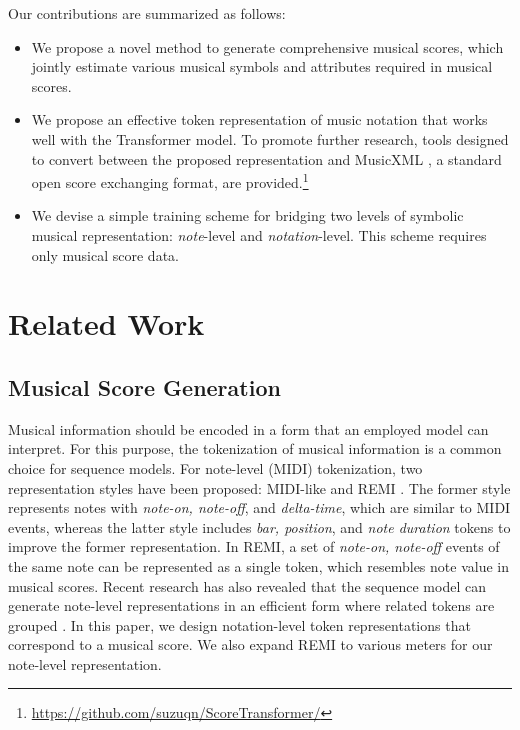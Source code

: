 \documentclass[sigconf]{acmart} %
\begin{document}
Our contributions are summarized as follows:
\begin{itemize}[leftmargin=1.25em]
\item We propose a novel method to generate comprehensive musical scores, which jointly estimate various musical symbols and attributes required in musical scores.
\item We propose an effective token representation of music notation that works well with the Transformer model. To promote further research, tools designed to convert between the proposed representation and MusicXML \cite{Good2003}, a standard open score exchanging format, are provided.\footnote{\url{https://github.com/suzuqn/ScoreTransformer/}}
\item We devise a simple training scheme for bridging two levels of symbolic musical representation: \textit{note}-level and \textit{notation}-level. This scheme requires only musical score data.
\end{itemize}

\section{Related Work}
\subsection{Musical Score Generation}
Musical information should be encoded in a form that an employed model can interpret. For this purpose, the tokenization of musical information is a common choice for sequence models. For note-level (MIDI) tokenization, two representation styles have been proposed: MIDI-like \cite{Oore2018} and REMI \cite{Huang2020}. The former style represents notes with \textit{note-on, note-off}, and \textit{delta-time}, which are similar to MIDI events, whereas the latter style includes \textit{bar, position}, and \textit{note duration} tokens to improve the former representation. In REMI, a set of \textit{note-on, note-off} events of the same note can be represented as a single token, which resembles note value in musical scores. Recent research has also revealed that the sequence model can generate note-level representations in an efficient form where related tokens are grouped \cite{Hsiao2021}. In this paper, we design notation-level token representations that correspond to a musical score. We also expand REMI to various meters for our note-level representation.
\end{document}
